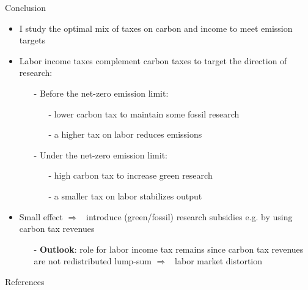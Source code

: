 \documentclass[11pt,aspectratio=169]{beamer}
\newcommand{\ar}{$\Rightarrow$ \ }
\begin{document}
\begin{frame}{Conclusion}
	\begin{itemize}[<+-| alert@+>]
		\item I study the optimal mix of taxes on carbon and income to meet emission targets
		\vspace{3mm}
		\item Labor income taxes complement carbon taxes to target the direction of research:
		\vspace{2mm}
		\begin{itemize}
			\item[-] Before the net-zero emission limit: 
			\begin{itemize}
				\item[-] lower carbon tax to maintain some fossil research
				\item[-] a higher tax on labor reduces emissions
			\end{itemize}
			\vspace{3mm}
			\item[-] Under the net-zero emission limit: 
			\begin{itemize}
				\item[-] high carbon tax to increase green research
				\item[-]  a smaller tax on labor stabilizes output
			\end{itemize}
		\end{itemize}
		\vspace{3mm}
		\item Small effect \ar introduce (green/fossil) research subsidies e.g. by using carbon tax revenues
		\vspace{2mm}
		
		\begin{itemize}
			\item[-] \textbf{Outlook}: role for labor income tax remains since carbon tax revenues are not redistributed lump-sum \ar labor market distortion
		\end{itemize}	
		
		
	\end{itemize}
\end{frame}


%

\begin{frame}[shrink]{References}
	
	
	
\end{frame}
\end{document}
